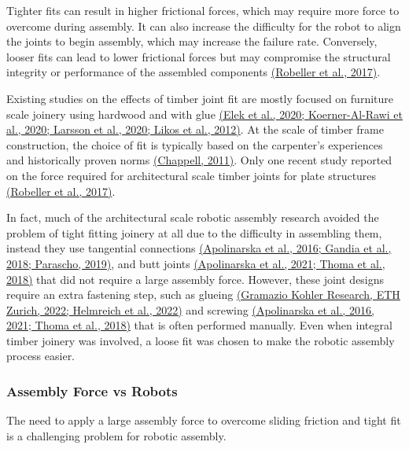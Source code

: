 \documentclass[11pt]{book}
\begin{document}
Tighter fits can result in higher frictional forces, which may require more force to overcome during assembly. It can also increase the difficulty for the robot to align the joints to begin assembly, which may increase the failure rate. Conversely, looser fits can lead to lower frictional forces but may compromise the structural integrity or performance of the assembled components \href{https://www.zotero.org/google-docs/?uzXtzz}{(Robeller et al., 2017)}.

Existing studies on the effects of timber joint fit are mostly focused on furniture scale joinery using hardwood and with glue \href{https://www.zotero.org/google-docs/?G6Rwhz}{(Elek et al., 2020; Koerner-Al-Rawi et al., 2020; Larsson et al., 2020; Likos et al., 2012)}. At the scale of timber frame construction, the choice of fit is typically based on the carpenter's experiences and historically proven norms \href{https://www.zotero.org/google-docs/?Gwwdvh}{(Chappell, 2011)}. Only one recent study reported on the force required for architectural scale timber joints for plate structures \href{https://www.zotero.org/google-docs/?saXZ5b}{(Robeller et al., 2017)}. 

In fact, much of the architectural scale robotic assembly research avoided the problem of tight fitting joinery at all due to the difficulty in assembling them, instead they use tangential connections \href{https://www.zotero.org/google-docs/?I1l6rV}{(Apolinarska et al., 2016; Gandia et al., 2018; Parascho, 2019)}, and butt joints \href{https://www.zotero.org/google-docs/?1HKFGK}{(Apolinarska et al., 2021; Thoma et al., 2018)} that did not require a large assembly force. However, these joint designs require an extra fastening step, such as glueing \href{https://www.zotero.org/google-docs/?uhxjvO}{(Gramazio Kohler Research, ETH Zurich, 2022; Helmreich et al., 2022)} and screwing \href{https://www.zotero.org/google-docs/?uAzdbA}{(Apolinarska et al., 2016, 2021; Thoma et al., 2018)} that is often performed manually. Even when integral timber joinery was involved, a loose fit was chosen to make the robotic assembly process easier. 

\subsubsection{Assembly Force vs Robots}

The need to apply a large assembly force to overcome sliding friction and tight fit is a challenging problem for robotic assembly. 
\end{document}
